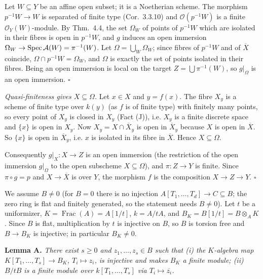 \documentclass[11pt]{article}
\begin{document}
Let $W\subseteq Y$ be an affine open subset; it is a Noetherian scheme. The morphism $p^{-1}W\to W$ is separated of finite type (Cor.~3.3.10) and $\mathcal O(p^{-1}W)$ is a finite $\mathcal O_Y(W)$-module. By Thm.~4.4, the set $\Omega_W$ of points of $p^{-1}W$ which are isolated in their fibres is open in $p^{-1}W$, and $g$ induces an open immersion $\Omega_W\to\operatorname{Spec}\mathcal A(W)=\pi^{-1}(W)$. Let $\Omega=\bigcup_W\Omega_W$; since fibres of $p^{-1}W$ and of $\overline X$ coincide, $\Omega\cap p^{-1}W=\Omega_W$, and $\Omega$ is exactly the set of points isolated in their fibres. Being an open immersion is local on the target $Z=\bigcup\pi^{-1}(W)$, so $g|_\Omega$ is an open immersion. \hfill$\square$

\emph{Quasi-finiteness gives $X\subseteq\Omega$.} Let $x\in X$ and $y=f(x)$. The fibre $X_y$ is a scheme of finite type over $k(y)$ (as $f$ is of finite type) with finitely many points, so every point of $X_y$ is closed in $X_y$ (Fact (J)), i.e. $X_y$ is a finite discrete space and $\{x\}$ is open in $X_y$. Now $X_y=X\cap\overline X_y$ is open in $\overline X_y$ because $X$ is open in $\overline X$. So $\{x\}$ is open in $\overline X_y$, i.e. $x$ is isolated in its fibre in $\overline X$. Hence $X\subseteq\Omega$.

Consequently $g|_X:X\to Z$ is an open immersion (the restriction of the open immersion $g|_\Omega$ to the open subscheme $X\subseteq\Omega$), and $\pi:Z\to Y$ is finite. Since $\pi\circ g=p$ and $X\to\overline X$ is over $Y$, the morphism $f$ is the composition $X\to Z\to Y$. \hfill$\square$

\pf
We assume $B\neq0$ (for $B=0$ there is no injection $A[T_1,\dots,T_d]\to C\subseteq B$; the zero ring is flat and finitely generated, so the statement needs $B\neq0$). Let $t$ be a uniformizer, $K=\operatorname{Frac}(A)=A[1/t]$, $k=A/tA$, and $B_K=B[1/t]=B\otimes_AK$. Since $B$ is flat, multiplication by $t$ is injective on $B$, so $B$ is torsion free and $B\to B_K$ is injective; in particular $B_K\neq0$.

\textbf{Lemma A.} \emph{There exist $s\ge0$ and $z_1,\dots,z_s\in B$ such that (i) the $K$-algebra map $K[T_1,\dots,T_s]\to B_K$, $T_i\mapsto z_i$, is injective and makes $B_K$ a finite module; (ii) $B/tB$ is a finite module over $k[T_1,\dots,T_s]$ via $T_i\mapsto\overline{z_i}$.}
\end{document}
